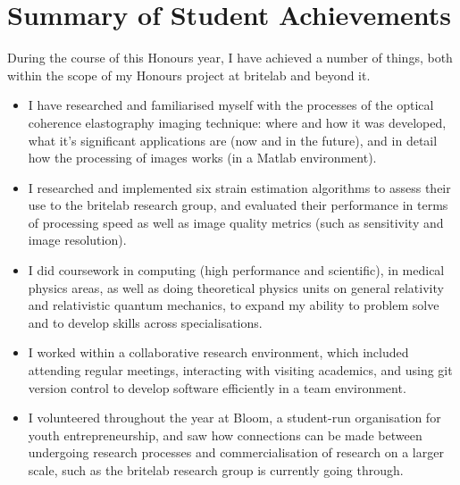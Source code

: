 \chapter{Summary of Student Achievements}

During the course of this Honours year, I have achieved a number of things, both within the scope of my Honours project at \ac{britelab} and beyond it. 

\begin{itemize}

\item I have researched and familiarised myself with the processes of the optical coherence elastography imaging technique: where and how it was developed, what it's significant applications are (now and in the future), and in detail how the processing of images works (in a Matlab environment). 

\item I researched and implemented six strain estimation algorithms to assess their use to the \ac{britelab} research group, and evaluated their performance in terms of processing speed as well as image quality metrics (such as sensitivity and image resolution).

\item I did coursework in computing (high performance and scientific), in medical physics areas, as well as doing theoretical physics units on general relativity and relativistic quantum mechanics, to expand my ability to problem solve and to develop skills across specialisations. 

\item I worked within a collaborative research environment, which included attending regular meetings, interacting with visiting academics, and using git version control to develop software efficiently in a team environment.

\item I volunteered throughout the year at Bloom, a student-run organisation for youth entrepreneurship, and saw how connections can be made between undergoing research processes and commercialisation of research on a larger scale, such as the \ac{britelab} research group is currently going through.

\end{itemize}
